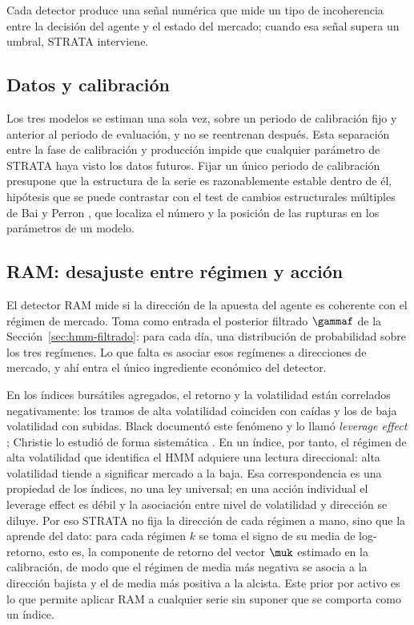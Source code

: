 Cada detector produce una señal numérica que mide un tipo de incoherencia entre la decisión del agente y el estado del mercado; cuando esa señal supera un umbral, STRATA interviene.

\subsection{Datos y calibración}
\label{sec:strata-calib}

Los tres modelos se estiman una sola vez, sobre un periodo de calibración fijo y anterior al periodo de evaluación, y no se reentrenan después. Esta separación entre la fase de calibración y producción impide que cualquier parámetro de STRATA haya visto los datos futuros. Fijar un único periodo de calibración presupone que la estructura de la serie es razonablemente estable dentro de él, hipótesis que se puede contrastar con el test de cambios estructurales múltiples de Bai y Perron \cite{bai1998, bai2003}, que localiza el número y la posición de las rupturas en los parámetros de un modelo. 

\subsection{RAM: desajuste entre régimen y acción}
\label{sec:strata-ram}

El detector RAM mide si la dirección de la apuesta del agente es coherente con el régimen de mercado. Toma como entrada el posterior filtrado $\gammaf$ de la Sección~\ref{sec:hmm-filtrado}: para cada día, una distribución de probabilidad sobre los tres regímenes. Lo que falta es asociar esos regímenes a direcciones de mercado, y ahí entra el único ingrediente económico del detector.

En los índices bursátiles agregados, el retorno y la volatilidad están correlados negativamente: los tramos de alta volatilidad coinciden con caídas y los de baja volatilidad con subidas. Black documentó este fenómeno y lo llamó \emph{leverage effect} \cite{black1976}; Christie lo estudió de forma sistemática \cite{christie1982}. En un índice, por tanto, el régimen de alta volatilidad que identifica el HMM adquiere una lectura direccional: alta volatilidad tiende a significar mercado a la baja. Esa correspondencia es una propiedad de los índices, no una ley universal; en una acción individual el leverage effect es débil y la asociación entre nivel de volatilidad y dirección se diluye. Por eso STRATA no fija la dirección de cada régimen a mano, sino que la aprende del dato: para cada régimen $k$ se toma el signo de su media de log-retorno, esto es, la componente de retorno del vector $\muk$ estimado en la calibración, de modo que el régimen de media más negativa se asocia a la dirección bajista y el de media más positiva a la alcista. Este prior por activo es lo que permite aplicar RAM a cualquier serie sin suponer que se comporta como un índice.

